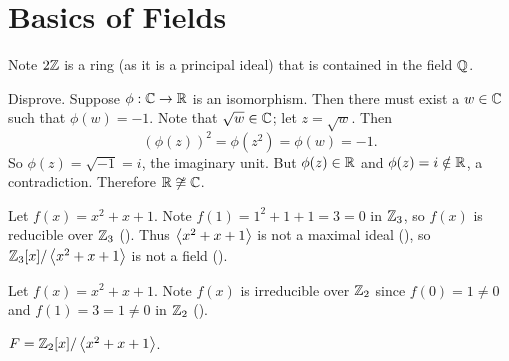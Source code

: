 \section{Basics of Fields}
\begin{questions}
    \item Note $2\mathbb{Z}$ is a ring (as it is a principal ideal) that is contained in the field $\mathbb{Q}$.

    \item Disprove. Suppose $\phi: \mathbb{C} \to \mathbb{R}$ is an isomorphism. Then there must exist a $w \in \mathbb{C}$ such that $\phi(w) = -1$. Note that $\sqrt{w} \in \mathbb{C}$; let $z = \sqrt{w}$. Then
    \[
        \left(\phi(z)\right)^2 = \phi\left(z^2\right) = \phi(w) = -1.
    \]
    So $\phi(z) = \sqrt{-1} = i$, the imaginary unit. But $\phi(z) \in \mathbb{R}$ and $\phi(z) = i \notin \mathbb{R}$, a contradiction. Therefore $\mathbb{R} \not\cong \mathbb{C}$.

    \item Let $f(x) = x^2 + x + 1$. Note $f(1) = 1^2 + 1 + 1 = 3 = 0$ in $\mathbb{Z}_3$, so $f(x)$ is reducible over $\mathbb{Z}_3$ (). Thus $\left\langle x^2+x+1\right\rangle$ is not a maximal ideal (), so $\mathbb{Z}_3[x]/\left\langle x^2+x+1\right\rangle$ is not a field ().

    \item Let $f(x) = x^2 + x + 1$. Note $f(x)$ is irreducible over $\mathbb{Z}_2$ since $f(0) = 1 \neq 0$ and $f(1) = 3 = 1 \neq 0$ in $\mathbb{Z}_2$ ().

    $F = \mathbb{Z}_2[x]/\left\langle x^2+x+1\right\rangle$.


\end{questions}
